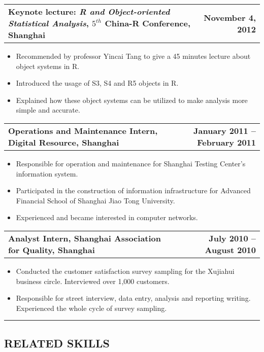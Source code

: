 \documentclass[11pt]{article}
\makeatletter
\newcommand{\headerrow}[2]
{\begin{tabular*}{\linewidth}{l@{\extracolsep{\fill}}r}
	#1 &
	#2 \\
\end{tabular*}}
\makeatother
\begin{document}
\noindent\headerrow
	{\textbf{Keynote lecture: \emph{R and Object-oriented Statistical Analysis}, $5^{th}$ China-R Conference, Shanghai}}
	{\textbf{November 4, 2012}}
\begin{itemize}[topsep=2pt, itemsep=-2pt]
    \setlength{\itemsep}{-2pt}
	\item Recommended by professor Yincai Tang to give a 45 minutes lecture about object systems in R.
	\item Introduced the usage of S3, S4 and R5 objects in R.
	\item Explained how these object systems can be utilized to make analysis more simple and accurate.
\end{itemize}

\noindent\headerrow
	{\textbf{Operations and Maintenance Intern, Digital Resource, Shanghai}}
	{\textbf{January 2011 – February 2011}}
\begin{itemize}[topsep=2pt, itemsep=-2pt]
    \setlength{\itemsep}{-2pt}
	\item Responsible for operation and maintenance for Shanghai Testing Center's information system.
	\item Participated in the construction of information infrastructure for Advanced Financial School of Shanghai Jiao Tong University.
	\item Experienced and became interested in computer networks.
\end{itemize}

\noindent\headerrow
	{\textbf{Analyst Intern, Shanghai Association for Quality, Shanghai}}
	{\textbf{July 2010 – August 2010}}
\begin{itemize}[topsep=2pt, itemsep=-2pt]
	\item Conducted the customer satisfaction survey sampling for the Xujiahui business circle. Interviewed over 1,000 customers.
	\item Responsible for street interview, data entry, analysis and reporting writing. Experienced the whole cycle of survey sampling.
\end{itemize}

\vspace{0.2em}
\hrule
\vspace{-1em}

\vspace{-1em}
\subsection*{\centering RELATED SKILLS}
\vspace{-.6em}
\end{document}
